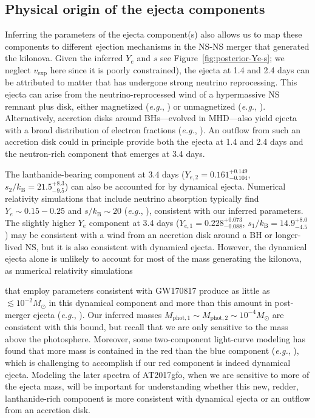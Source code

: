 \documentclass[twocolumn,twocolappendix]{aastex63}
\def\eg{{\it e.g.}}
\begin{document}
{{{{{{{%
\subsection{Physical origin of the ejecta components}\label{ssc:disco-origins}

Inferring the parameters of the ejecta component(s) also allows us to map these components to different ejection mechanisms in the NS-NS merger that generated the kilonova. Given the inferred $Y_e$ and $s$ see Figure~\ref{fig:posterior-Ye-s}; we neglect $v_{\mathrm{exp}}$ here since it is poorly constrained), the ejecta at 1.4 and 2.4 days can be attributed to matter that has undergone strong neutrino reprocessing. This ejecta can arise from the neutrino-reprocessed wind of a hypermassive NS remnant plus disk, either magnetized (\eg, \citealt{combi23,curtis23b,fahlman23,kiuchi23}) or unmagnetized (\eg, \citealt{fujibayashi23,just23}). Alternatively, accretion disks around BHs---evolved in MHD---also yield ejecta with a broad distribution of electron fractions (\eg, \citealt{siegel18, fernandez19, christie19, miller19, just22, fahlman22, hayashi23, curtis23a}). An outflow from such an accretion disk could in principle provide both the ejecta at 1.4 and 2.4 days and the neutron-rich component that emerges at 3.4 days. 
 
The lanthanide-bearing component at 3.4 days ($Y_{e,2} = 0.161^{+0.149}_{-0.104}$, $s_2 / k_{\mathrm{B}} = 21.5^{+8.3}_{-9.5}$) can also be accounted for by dynamical ejecta. Numerical relativity simulations that include neutrino absorption typically find $Y_e \sim 0.15 - 0.25$ and $s / k_{\mathrm{B}} \sim 20$ (\eg, \citealt{zappa23}), consistent with our inferred  parameters. The slightly higher $Y_e$ component at 3.4 days ($Y_{e,1} = 0.228^{+0.073}_{-0.088}$, $s_1 / k_{\mathrm{B}} = 14.9^{+8.0}_{-4.5}$) may be consistent with a wind from an accretion disk around a BH or longer-lived NS, but it is also consistent with dynamical ejecta. However, the dynamical ejecta alone is unlikely to account for most of the mass generating the kilonova, as numerical relativity simulations {that employ parameters consistent with GW170817 produce as little as $\lesssim 10^{-2} M_{\odot}$ in this dynamical component and more than this amount in post-merger ejecta (\eg, \citealt{shibata17, most19, nedora21}). Our inferred masses $M_{\mathrm{phot},1} \sim M_{\mathrm{phot},2} \sim 10^{-4} M_{\odot}$ are consistent with this bound, but recall that we are only sensitive to the mass above the photosphere. Moreover, some two-component light-curve modeling has found that more mass is contained in the red than the blue component (\eg, \citealt{chornock17, cowperthwaite17, villar17}), which is challenging to accomplish if our red component is indeed dynamical ejecta. Modeling the later spectra of AT2017gfo, when we are sensitive to more of the ejecta mass, will be important for understanding whether this new, redder, lanthanide-rich component is more consistent with dynamical ejecta or an outflow from an accretion disk. 


}}}}}}}}
\end{document}
